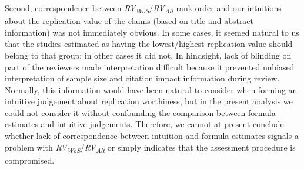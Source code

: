 \documentclass[
  english,
  man,floatsintext]{apa6}
\begin{document}
Second, correspondence between \emph{RV\textsubscript{WoS}}/\emph{RV\textsubscript{Alt}} rank order and our intuitions about the replication value of the claims (based on title and abstract information) was not immediately obvious. In some cases, it seemed natural to us that the studies estimated as having the lowest/highest replication value should belong to that group; in other cases it did not. In hindsight, lack of blinding on part of the reviewers made interpretation difficult because it prevented unbiased interpretation of sample size and citation impact information during review. Normally, this information would have been natural to consider when forming an intuitive judgement about replication worthiness, but in the present analysis we could not consider it without confounding the comparison between formula estimates and intuitive judgements. Therefore, we cannot at present conclude whether lack of correspondence between intuition and formula estimates signals a problem with \emph{RV\textsubscript{WoS}}/\emph{RV\textsubscript{Alt}} or simply indicates that the assessment procedure is compromised.
\end{document}
